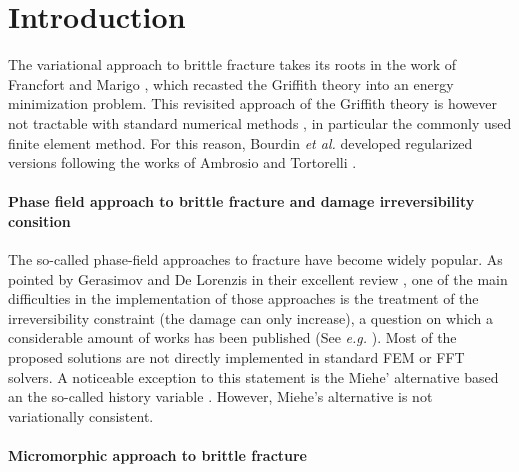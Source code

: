 \section{Introduction}

The variational approach to brittle fracture takes its roots in the work of
Francfort and Marigo \cite{francfort_revisiting_1998,francfort_vers_2002},
which recasted the Griffith theory into an energy
minimization problem.
This revisited approach of the Griffith theory is however not tractable
with standard numerical methods
\cite{bourdin_numerical_2000, chambolle_approximation_2018}, in particular
the commonly used finite element method. For this reason, Bourdin \textit{et
al.} developed regularized versions \cite{bourdin_numerical_2000} following
the works of Ambrosio and Tortorelli \cite{ambrosio_approximation_1990}.

\paragraph{Phase field approach to brittle fracture and damage irreversibility consition}

The so-called phase-field approaches to fracture have become
widely popular. As pointed by Gerasimov and De Lorenzis in their
excellent review \cite{gerasimov_numerical_2020}, one of the main
difficulties in the implementation of those approaches is the treatment
of the irreversibility constraint (the damage can only increase), a
question on which a considerable amount of works has been published
(See \textit{e.g.}
\cite{Bourdin2014, Laurenzis2020, DelPietroLancioniMarch2020, Chambolle2018, Gerasimov2019, Bourdin2008}).
Most of the proposed solutions are not directly implemented in standard
FEM or FFT solvers. A noticeable exception to this statement is the
Miehe' alternative based an the so-called history variable
\cite{miehe_phase_2010}. However, Miehe's alternative is not variationally
consistent.

\paragraph{Micromorphic approach to brittle fracture}

